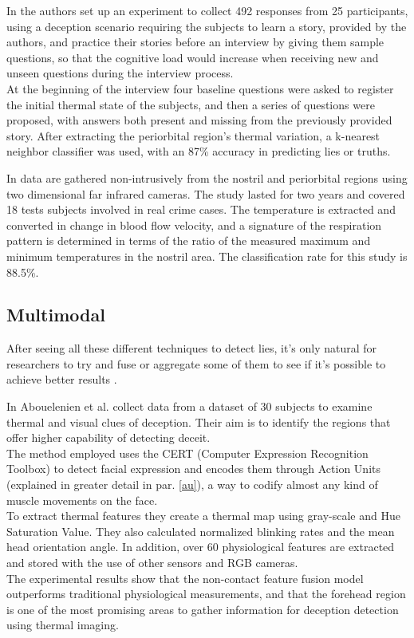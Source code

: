 In \cite{Rajoub} the authors set up an experiment to collect 492 responses from 25 participants, using a deception scenario requiring the subjects to learn a story, provided by the authors, and practice their stories before an interview by giving them sample questions, so that the cognitive load would increase when receiving new and unseen questions during the interview process.\\ 
At the beginning of the interview four baseline questions were asked to register the initial thermal state of the subjects, and then a series of questions were proposed, with answers both present and missing from the previously provided story. After extracting the periorbital region's thermal variation, a k-nearest neighbor classifier was used, with an 87\% accuracy in predicting lies or truths.

In \cite{6967765} data are gathered non-intrusively from the nostril and periorbital regions using two dimensional far infrared cameras. The study lasted for two years and covered 18 tests subjects involved in real crime cases. The temperature is extracted and converted in change in blood flow velocity, and a signature of the respiration pattern is determined in terms of the ratio of the measured maximum and minimum temperatures in the nostril area. The classification rate for this study is 88.5\%.

\subsection{Multimodal}
After seeing all these different techniques to detect lies, it's only natural for researchers to try and fuse or aggregate some of them to see if it's possible to achieve better results \cite{Abouelenien:2014:DDU:2663204.2663229}.

In \cite{Abouelenien:2016:ATV:2910674.2910682} Abouelenien et al. collect data from a dataset of 30 subjects to examine thermal and visual clues of deception. Their aim is to identify the regions that offer higher capability of detecting deceit. \\
The method employed uses the CERT (Computer Expression Recognition Toolbox) to detect facial expression and encodes them through Action Units (explained in greater detail in par. \ref{au}), a way to codify almost any kind of muscle movements on the face. \\
To extract thermal features they create a thermal map using gray-scale and Hue Saturation Value. They also calculated normalized blinking rates and the mean head orientation angle. In addition, over 60 physiological features are extracted and stored with the use of other sensors and RGB cameras. \\
The experimental results show that the non-contact feature fusion model outperforms traditional physiological measurements, and that the forehead region is one of the most promising areas to gather information for deception detection using thermal imaging.

